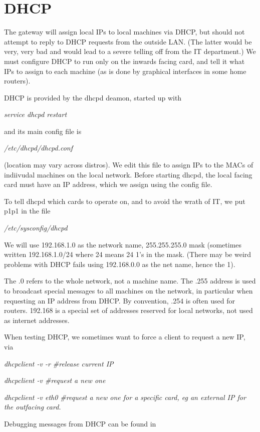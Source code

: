 \documentclass[oneside,english]{scrbook}
\begin{document}
\section{DHCP}

The gateway will assign local IPs to local machines via DHCP, but
should not attempt to reply to DHCP requests from the outside LAN.
(The latter would be very, very bad and would lead to a severe telling
off from the IT department.) We must configure DHCP to run only on
the inwards facing card, and tell it what IPs to assign to each machine
(as is done by graphical interfaces in some home routers).

DHCP is provided by the dhcpd deamon, started up with

\emph{service dhcpd restart}

and its main config file is

\emph{/etc/dhcpd/dhcpd.conf}

(location may vary across distros). We edit this file to assign IPs
to the MACs of indiivudal machines on the local network. Before starting
dhcpd, the local facing card must have an IP address, which we assign
using the config file.

To tell dhcpd which cards to operate on, and to avoid the wrath of
IT, we put p1p1 in the file

\emph{/etc/sysconfig/dhcpd}

We will use 192.168.1.0 as the network name, 255.255.255.0 mask (sometimes
written 192.168.1.0/24 where 24 means 24 1's in the mask. (There may
be weird problems with DHCP fails using 192.168.0.0 as the net name,
hence the 1).

The .0 refers to the whole network, not a machine name. The .255 address
is used to broadcast special messages to all machines on the network,
in particular when requesting an IP address from DHCP. By convention,
.254 is often used for routers. 192.168 is a special set of addresses
reserved for local networks, not used as internet addresses.

When testing DHCP, we sometimes want to force a client to request
a new IP, via

\emph{dhcpclient -v -r \#release current IP}

\emph{dhcpclient -v \#request a new one}

\emph{dhcpclient -v eth0 \#request a new one for a specific card,
eg an external IP for the outfacing card.}

Debugging messages from DHCP can be found in
\end{document}
